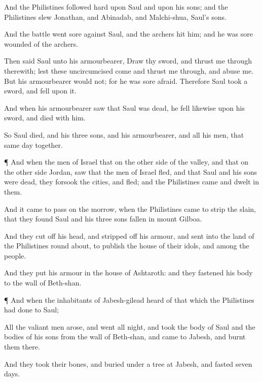 {And the
Philistines followed
hard upon
Saul and upon his
sons; and the
Philistines
slew
Jonathan, and
Abinadab, and
Malchi-shua,
Saul’s
sons.

And the
battle went
sore against
Saul, and the
archers
hit him; and he was
sore
wounded of the
archers.

Then
said
Saul unto his
armourbearer,
Draw thy
sword, and thrust me
through therewith; lest these
uncircumcised
come and thrust me
through, and
abuse me. But his
armourbearer
would not; for he was
sore
afraid. Therefore
Saul
took a
sword, and
fell upon it.

And when his
armourbearer
saw that
Saul was
dead, he
fell likewise upon his
sword, and
died with him.

So
Saul
died, and his
three
sons, and his
armourbearer, and all his
men, that same
day
together.


\par }{\PP {}¶ And when the
men of
Israel that
{} on the other
side of the
valley, and
{} that
{} on the other
side
Jordan,
saw that the
men of
Israel
fled, and that
Saul and his
sons were
dead, they
forsook the
cities, and
fled; and the
Philistines
came and
dwelt in them.


\par }{\PP {}And it came to pass on the
morrow, when the
Philistines
came to
strip the
slain, that they
found
Saul and his
three
sons
fallen in
mount
Gilboa.

And they cut
off his
head, and stripped
off his
armour, and
sent into the
land of the
Philistines round
about, to
publish
{} the
house of their
idols, and among the
people.

And they
put his
armour in the
house of
Ashtaroth: and they
fastened his
body to the
wall of
Beth-shan.


\par }{\PP {}¶ And when the
inhabitants of
Jabesh-gilead
heard of that which the
Philistines had
done to
Saul;

All the
valiant
men
arose, and
went all
night, and
took the
body of
Saul and the
bodies of his
sons from the
wall of
Beth-shan, and
came to
Jabesh, and
burnt them there.

And they
took their
bones, and
buried
{} under a
tree at
Jabesh, and
fasted
seven
days.


\par }